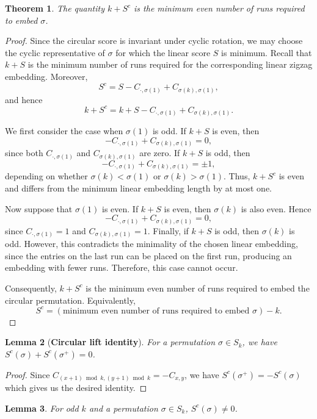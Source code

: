 \documentclass[a4paper,12pt]{article}
\newtheorem{theorem}{Theorem}[section]
\newtheorem{lemma}[theorem]{Lemma}
\theoremstyle{definition}
\numberwithin{equation}{section}
\begin{document}
\begin{theorem}
    The quantity $k+S^c$ is the minimum even number of runs required to embed $\sigma$. 
\end{theorem}

\begin{proof}
Since the circular score is invariant under cyclic rotation, we may choose the cyclic representative of $\sigma$ for which the linear score $S$ is minimum. Recall that $k+S$ is the minimum number of runs required for the corresponding linear zigzag embedding. Moreover,
\[
S^c=S-C_{\cdot,\sigma(1)}+C_{\sigma(k),\sigma(1)},
\]
and hence
\[
k+S^c
=
k+S-C_{\cdot,\sigma(1)}+C_{\sigma(k),\sigma(1)}.
\]

We first consider the case when $\sigma(1)$ is odd. If $k+S$ is even, then
\[
-C_{\cdot,\sigma(1)}+C_{\sigma(k),\sigma(1)}=0,
\]
since both $C_{\cdot,\sigma(1)}$ and $C_{\sigma(k),\sigma(1)}$ are zero. If $k+S$ is odd, then
\[
-C_{\cdot,\sigma(1)}+C_{\sigma(k),\sigma(1)}=\pm1,
\]
depending on whether $\sigma(k)<\sigma(1)$ or $\sigma(k)>\sigma(1)$. Thus, $k+S^c$ is even and differs from the minimum linear embedding length by at most one.

Now suppose that $\sigma(1)$ is even. If $k+S$ is even, then $\sigma(k)$ is also even. Hence
\[
-C_{\cdot,\sigma(1)}+C_{\sigma(k),\sigma(1)}=0,
\]
since $C_{\cdot,\sigma(1)}=1$ and $C_{\sigma(k),\sigma(1)}=1$. Finally, if $k+S$ is odd, then $\sigma(k)$ is odd. However, this contradicts the minimality of the chosen linear embedding, since the entries on the last run can be placed on the first run, producing an embedding with fewer runs. Therefore, this case cannot occur.

Consequently, $k+S^c$ is the minimum even number of runs required to embed the circular permutation. Equivalently,
\[
S^c=(\text{minimum even number of runs required to embed }\sigma)-k.
\]
\end{proof}


 \begin{lemma}[\textbf{Circular lift identity}]
     For a permutation $\sigma\in S_k$, we have $S^c(\sigma) + S^c(\sigma^+) = 0$.
 \end{lemma}
 \begin{proof}
 Since $C_{(x+1)\bmod k,(y+1)\bmod k} = -C_{x,y}$, we have $S^c(\sigma^+) = -S^c(\sigma)$ which gives us the desired identity.
\end{proof}
\begin{lemma}\label{oddsum}
For odd $k$ and a permutation $\sigma\in S_k$, $S^c(\sigma)\neq 0$.
\end{lemma}
\end{document}
